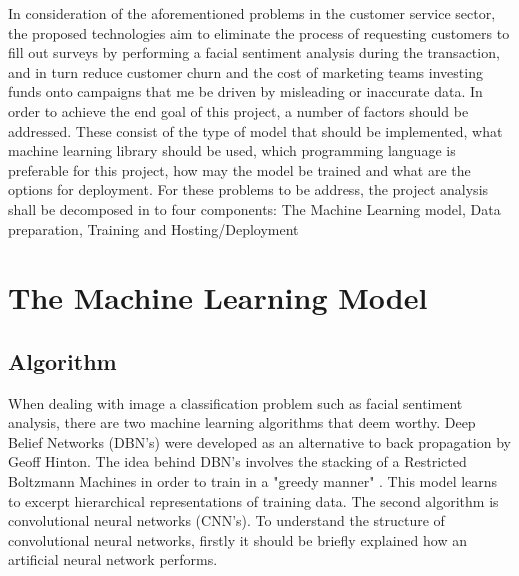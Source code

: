 In consideration of the aforementioned problems in the customer service sector, the proposed technologies aim to eliminate the process of requesting customers to fill out surveys by performing a facial sentiment analysis during the transaction, and in turn reduce customer churn and the cost of marketing teams investing funds onto campaigns that me be driven by misleading or inaccurate data. In order to achieve the end goal of this project, a number of factors should be addressed. These consist of the type of model that should be implemented, what machine learning library should be used, which programming language is preferable for this project, how may the model be trained and what are the options for deployment. For these problems to be address, the project analysis shall be decomposed in to four components: The Machine Learning model, Data preparation, Training and Hosting/Deployment


 	
 	


\section{The Machine Learning Model}


\subsection{Algorithm}
When dealing with image a classification problem such as facial sentiment analysis, there are two machine learning algorithms that deem worthy. Deep Belief Networks (DBN's) were developed as an alternative to back propagation by Geoff Hinton. The idea behind DBN's involves the stacking of a Restricted Boltzmann Machines in order to train in a "greedy manner" \citep{dbn}. This model learns to excerpt hierarchical representations of training data. The second algorithm is convolutional neural networks (CNN's). %
To understand the structure of convolutional neural networks, firstly it should be briefly explained how an artificial neural network performs.

